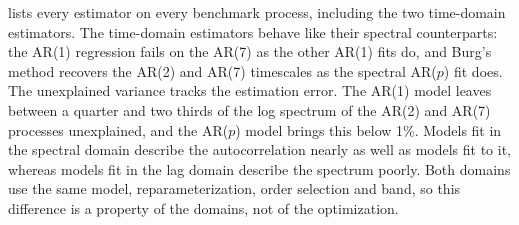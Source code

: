 \documentclass[pdflatex,sn-mathphys-num]{sn-jnl}
\begin{document}
 lists every estimator on every benchmark process, including the two time-domain estimators. The time-domain estimators behave like their spectral counterparts: the AR(1) regression fails on the AR(7) as the other AR(1) fits do, and Burg's method recovers the AR(2) and AR(7) timescales as the spectral AR($p$) fit does. The unexplained variance tracks the estimation error. The AR(1) model leaves between a quarter and two thirds of the log spectrum of the AR(2) and AR(7) processes unexplained, and the AR($p$) model brings this below 1\%. Models fit in the spectral domain describe the autocorrelation nearly as well as models fit to it, whereas models fit in the lag domain describe the spectrum poorly. Both domains use the same model, reparameterization, order selection and band, so this difference is a property of the domains, not of the optimization.
\end{document}
